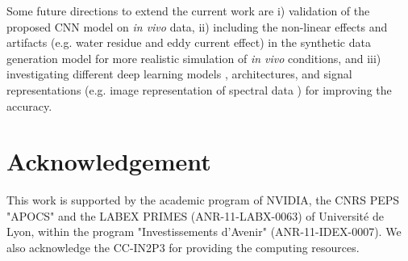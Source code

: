 \documentclass{llncs}
\begin{document}
Some future directions to extend the current work are i) validation of the proposed CNN model on\textit{ in vivo} data, ii) including the non-linear effects and artifacts (e.g. water residue and eddy current effect) in the synthetic data generation model for more realistic simulation of\textit{ in vivo} conditions, and iii) investigating different deep learning models%
, architectures, and signal representations (e.g. image representation of spectral data \cite{hatami2017}) for improving the accuracy.

\section*{Acknowledgement}

This work is supported by the academic program of NVIDIA, the CNRS PEPS "APOCS" and the LABEX PRIMES (ANR-11-LABX-0063) of Universit\'e de Lyon, within the program "Investissements d'Avenir" (ANR-11-IDEX-0007).
We also acknowledge the CC-IN2P3 for providing the computing resources.


\end{document}
